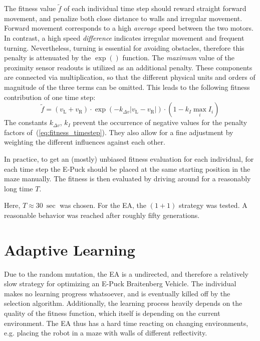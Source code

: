 \documentclass[a4paper]{jacow}
\begin{document}
The fitness value $\tilde{f}$ of each individual time step should reward straight forward movement, and penalize both close distance to walls and irregular movement. Forward movement corresponds to a high \emph{average} speed between the two motors. In contrast, a high speed \emph{difference} indicates irregular movement and frequent turning. Nevertheless, turning is essential for avoiding obstacles, therefore this penalty is attenuated by the $\exp()$ function. The \emph{maximum} value of the proximity sensor readouts is utilized as an additional penalty. These components are connected via multiplication, so that the different physical units and orders of magnitude of the three terms can be omitted. This leads to the following fitness contribution of one time step:
\begin{equation}
	\tilde{f} = \left( v_\mathrm{L} + v_\mathrm{R} \right) \cdot \exp\left( - k_{\Delta v}|v_\mathrm{L}-v_\mathrm{R}| \right) \cdot \left(1- k_{I} \max\limits_i I_i\right)
	\label{eq:fitness_timestep} 
\end{equation}
The constants $k_{\Delta v}$, $k_I$ prevent the occurrence of negative values for the penalty factors of~(\ref{eq:fitness_timestep}). They also allow for a fine adjustment by weighting the different influences against each other.

In practice, to get an (mostly) unbiased fitness evaluation for each individual, for each time step the E-Puck should be placed at the same starting position in the maze manually. The fitness is then evaluated by driving around for a reasonably long time $T$. 

Here, $T\approx\SI{30}{\sec}$ was chosen. For the EA, the $(1+1)$ strategy was tested. A reasonable behavior was reached after roughly fifty generations.


\section{Adaptive Learning}

Due to the random mutation, the EA is a undirected, and therefore a relatively slow strategy for optimizing an E-Puck Braitenberg Vehicle. The individual makes no learning progress whatsoever, and is eventually killed off by the selection algorithm. Additionally, the learning process heavily depends on the quality of the fitness function, which itself is depending on the current environment. The EA thus has a hard time reacting on changing environments, e.g. placing the robot in a maze with walls of different reflectivity.
\end{document}
